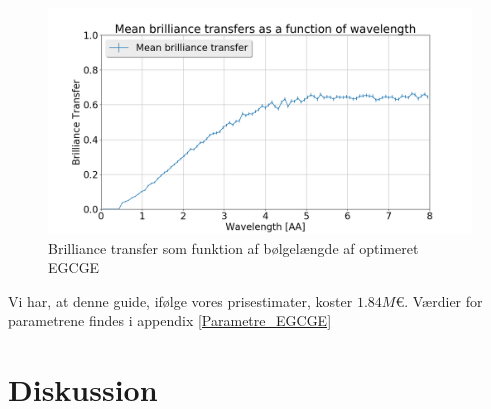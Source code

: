 \documentclass[12pt,oneside,a4paper]{article}
\begin{document}
{{{{{\begin{figure}[H]
\centering
\includegraphics[width=1\textwidth]{brill_optimized_mean_148957776280566.png}
\caption{Brilliance transfer som funktion af bølgelængde af optimeret EGCGE} \label{EGCGE_brill}
\end{figure}
Vi har, at denne guide, ifølge vores prisestimater, koster $1.84M\text{€}$. Værdier for parametrene findes i appendix \ref{Parametre_EGCGE}

\section{Diskussion}

}}}}}
\end{document}
